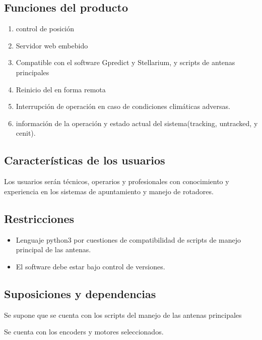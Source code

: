 \documentclass[12pt,a4paper, twosite]{article}
\begin{document}
	\subsection{Funciones del producto}
	\label{sec:orgaf51da6}
	\begin{enumerate}
		\item control de posición
		\item Servidor web embebido 
		\item Compatible con el software Gpredict y Stellarium, y scripts de antenas principales 
		\item Reinicio del en forma remota  
		\item Interrupción de operación en caso de condiciones climáticas adversas. 
		\item información de la operación y estado actual del sistema(tracking, untracked, y cenit). 
	\end{enumerate}
	
	\subsection{Características de los usuarios}
	\label{sec:orga40b0ee}
	Los usuarios serán técnicos, operarios y profesionales con conocimiento y experiencia en los sistemas de apuntamiento y manejo de rotadores. 
	\subsection{Restricciones}
	\label{sec:org5ca5790}
	
	
	\begin{itemize}
		
		\item Lenguaje python3 por cuestiones de compatibilidad de scripts de manejo principal de las antenas.
		\item El software debe estar bajo control de versiones.  
	\end{itemize}
	
	
	\subsection{Suposiciones y dependencias}
	\label{sec:org0ae23fe}
	Se supone que se cuenta con los scripts del manejo de las antenas principales 
	
	Se cuenta con los encoders y motores seleccionados. 
	
\end{document}
